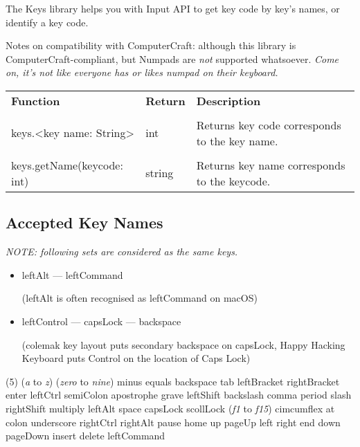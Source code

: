 The Keys library helps you with Input API to get key code by key's names, or identify a key code.

Notes on compatibility with ComputerCraft: although this library is ComputerCraft-compliant, but Numpads are \emph{not} supported whatsoever. \textit{Come on, it's not like everyone has or likes numpad on their keyboard.}

\begin{tabularx}{\textwidth}{l l X}
	\textbf{\large Function} & \textbf{\large Return} & \textbf{\large Description}
	\\ \\
	\endhead
	keys.<key name: String> & int & Returns key code corresponds to the key name.
	\\ \\
	keys.getName(keycode: int) & string & Returns key name corresponds to the keycode.
\end{tabularx}

\subsection{Accepted Key Names}

\emph{NOTE: following sets are considered as the same keys.}

\begin{itemize}
\item leftAlt --- leftCommand

(leftAlt is often recognised as leftCommand on macOS)

\item leftControl --- capsLock --- backspace

(colemak key layout puts secondary backspace on capsLock, Happy Hacking Keyboard puts Control on the location of Caps Lock)
\end{itemize}

\begin{tasks}[counter-format=\-](5)
	\task (\emph{a} to \emph{z})
	\task (\emph{zero} to \emph{nine})
	\task minus
	\task equals
	\task backspace
	\task tab
	\task leftBracket
	\task rightBracket
	\task enter
	\task leftCtrl
	\task semiColon
	\task apostrophe
	\task grave
	\task leftShift
	\task backslash
	\task comma
	\task period
	\task slash
	\task rightShift
	\task multiply
	\task leftAlt
	\task space
	\task capsLock
	\task scollLock
	\task (\emph{f1} to \emph{f15})
	\task cimcumflex
	\task at
	\task colon
	\task underscore
	\task rightCtrl
	\task rightAlt
	\task pause
	\task home
	\task up
	\task pageUp
	\task left
	\task right
	\task end
	\task down
	\task pageDown
	\task insert
	\task delete
	\task leftCommand
\end{tasks}